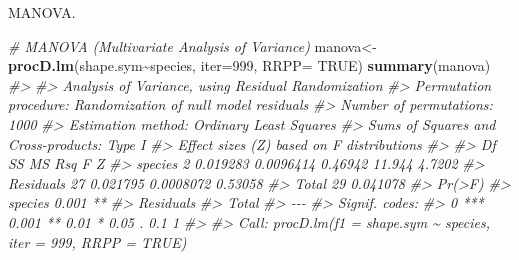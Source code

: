 \documentclass[
]{book}
\newenvironment{Shaded}{\begin{snugshade}}{\end{snugshade}}
\newcommand{\AttributeTok}[1]{\textcolor[rgb]{0.13,0.29,0.53}{#1}}
\newcommand{\CommentTok}[1]{\textcolor[rgb]{0.56,0.35,0.01}{\textit{#1}}}
\newcommand{\ConstantTok}[1]{\textcolor[rgb]{0.56,0.35,0.01}{#1}}
\newcommand{\DecValTok}[1]{\textcolor[rgb]{0.00,0.00,0.81}{#1}}
\newcommand{\FunctionTok}[1]{\textcolor[rgb]{0.13,0.29,0.53}{\textbf{#1}}}
\newcommand{\NormalTok}[1]{#1}
\newcommand{\OtherTok}[1]{\textcolor[rgb]{0.56,0.35,0.01}{#1}}
\newcommand{\SpecialCharTok}[1]{\textcolor[rgb]{0.81,0.36,0.00}{\textbf{#1}}}
\begin{document}
MANOVA.

\begin{Shaded}
\begin{Highlighting}[]
\CommentTok{\# MANOVA (Multivariate Analysis of Variance)}
\NormalTok{manova}\OtherTok{\textless{}{-}}\FunctionTok{procD.lm}\NormalTok{(shape.sym}\SpecialCharTok{\textasciitilde{}}\NormalTok{species, }\AttributeTok{iter=}\DecValTok{999}\NormalTok{, }\AttributeTok{RRPP=} \ConstantTok{TRUE}\NormalTok{)}
\FunctionTok{summary}\NormalTok{(manova)}
\CommentTok{\#\textgreater{} }
\CommentTok{\#\textgreater{} Analysis of Variance, using Residual Randomization}
\CommentTok{\#\textgreater{} Permutation procedure: Randomization of null model residuals }
\CommentTok{\#\textgreater{} Number of permutations: 1000 }
\CommentTok{\#\textgreater{} Estimation method: Ordinary Least Squares }
\CommentTok{\#\textgreater{} Sums of Squares and Cross{-}products: Type I }
\CommentTok{\#\textgreater{} Effect sizes (Z) based on F distributions}
\CommentTok{\#\textgreater{} }
\CommentTok{\#\textgreater{}           Df       SS        MS     Rsq      F      Z}
\CommentTok{\#\textgreater{} species    2 0.019283 0.0096414 0.46942 11.944 4.7202}
\CommentTok{\#\textgreater{} Residuals 27 0.021795 0.0008072 0.53058              }
\CommentTok{\#\textgreater{} Total     29 0.041078                                }
\CommentTok{\#\textgreater{}           Pr(\textgreater{}F)   }
\CommentTok{\#\textgreater{} species    0.001 **}
\CommentTok{\#\textgreater{} Residuals          }
\CommentTok{\#\textgreater{} Total              }
\CommentTok{\#\textgreater{} {-}{-}{-}}
\CommentTok{\#\textgreater{} Signif. codes:  }
\CommentTok{\#\textgreater{} 0 \textquotesingle{}***\textquotesingle{} 0.001 \textquotesingle{}**\textquotesingle{} 0.01 \textquotesingle{}*\textquotesingle{} 0.05 \textquotesingle{}.\textquotesingle{} 0.1 \textquotesingle{} \textquotesingle{} 1}
\CommentTok{\#\textgreater{} }
\CommentTok{\#\textgreater{} Call: procD.lm(f1 = shape.sym \textasciitilde{} species, iter = 999, RRPP = TRUE)}


\end{Highlighting}
\end{Shaded}
\end{document}
